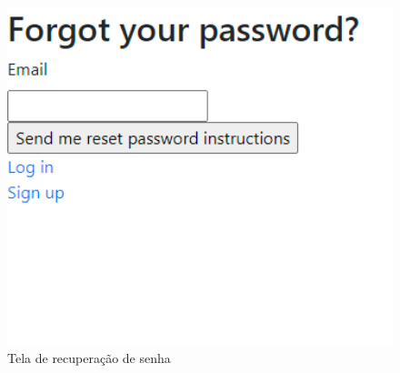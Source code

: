 \begin{itemize}
        \begin{figure}[H]
          \begin{center}
            \includegraphics[width=12cm]{Pictures/interface/recuperar.png}
            \caption{Tela de recuperação de senha} \label{recuperar}
          \end{center}
        \end{figure}


\end{itemize}
